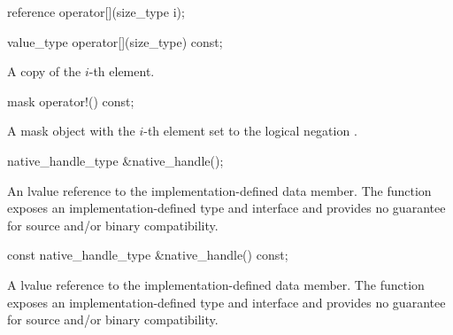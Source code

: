 \begin{itemdecl}
reference operator[](size_type i);
\end{itemdecl}
\begin{itemdescr}
  \dataparElementReference
\end{itemdescr}

\begin{itemdecl}
value_type operator[](size_type) const;
\end{itemdecl}
\begin{itemdescr}
  \pnum\returns A copy of the $i$-th element.
\end{itemdescr}

\begin{itemdecl}
mask operator!() const;
\end{itemdecl}
\begin{itemdescr}
  \pnum\returns A mask object with the $i$-th element set to the logical negation \foralli.
\end{itemdescr}

\begin{itemdecl}
native_handle_type &native_handle();
\end{itemdecl}
\begin{itemdescr}
  \pnum\returns An lvalue reference to the implementation-defined data member.
  \pnum\realnote The function exposes an implementation-defined type and interface and provides no guarantee for source and/or binary compatibility.
\end{itemdescr}

\begin{itemdecl}
const native_handle_type &native_handle() const;
\end{itemdecl}
\begin{itemdescr}
  \pnum\returns A \const lvalue reference to the implementation-defined data member.
  \pnum\realnote The function exposes an implementation-defined type and interface and provides no guarantee for source and/or binary compatibility.
\end{itemdescr}


